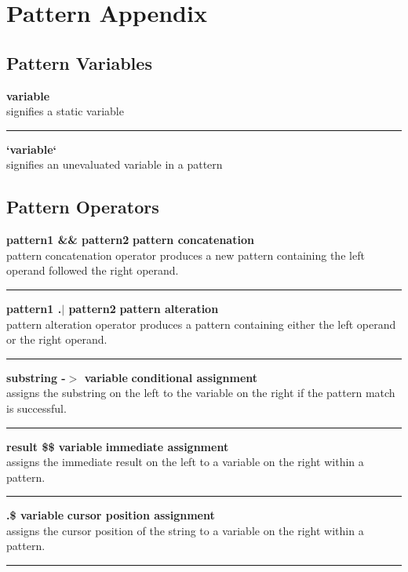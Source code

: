\documentclass{article}
\begin{document}
\section{Pattern Appendix}

\subsection{Pattern Variables}
\textbf{variable} \\
 signifies a static variable\\
\noindent\rule{12cm}{0.4pt}
 
\noindent\textbf{`variable`} \\
signifies an unevaluated variable in a pattern\\

\subsection{Pattern Operators}
\noindent\textbf{pattern1 \&\&	pattern2} \hfill \textbf{pattern concatenation}\\
pattern concatenation operator produces a new pattern containing the left operand followed the right operand.\\
\noindent\rule{12cm}{0.4pt}

\noindent\textbf{pattern1 .$\mid$ pattern2} \hfill \textbf{pattern alteration}\\
pattern alteration operator produces a pattern containing either the left operand or the right operand.\\
\noindent\rule{12cm}{0.1pt}

\noindent\textbf{substring -$>$ variable} \hfill\textbf{conditional assignment}\\
assigns the substring on the left to the variable on the right if the pattern match is successful.\\
\noindent\rule{12cm}{0.1pt}

\noindent\textbf{result \$\$ variable} \hfill\textbf{immediate assignment}\\
assigns the immediate result on the left to a variable on the right within a pattern.\\
\noindent\rule{12cm}{0.1pt}

\noindent\textbf{.\$ variable} \hfill\textbf{cursor position assignment}\\
assigns the cursor position of the string to a variable on the right within a pattern.\\
\noindent\rule{12cm}{0.1pt}
\end{document}
